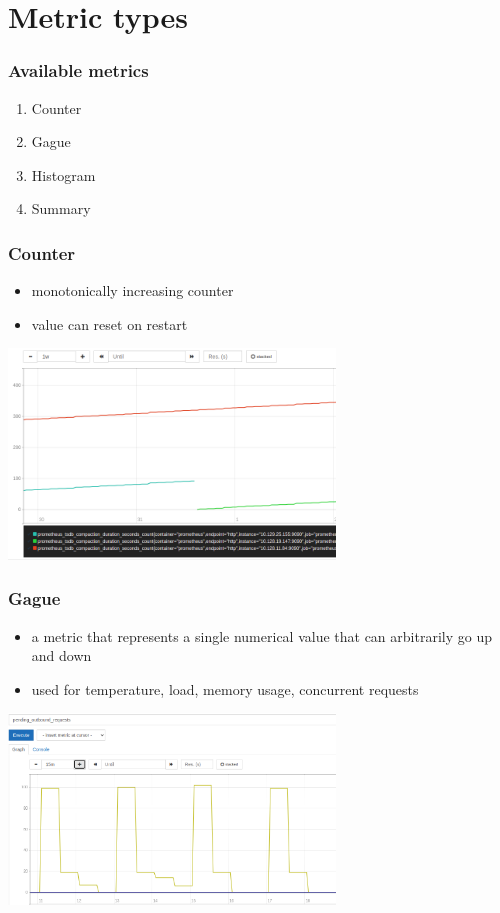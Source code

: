 \documentclass[xcolor=dvipsnames]{beamer}
\begin{document}
\section{Metric types}
\begin{frame}
 \frametitle{Available metrics}
 \begin{enumerate}
  \item Counter
  \item Gague
  \item Histogram
  \item Summary
 \end{enumerate}
\end{frame}
\begin{frame}
 \frametitle{Counter}
 \begin{itemize}
  \item  monotonically increasing counter
  \item value can reset on restart
 \end{itemize}
 \centering
\includegraphics[width=0.65\textwidth]{counter.png}
\end{frame}

\begin{frame}
 \frametitle{Gague}
 \begin{itemize}
  \item  a metric that represents a single numerical value that can arbitrarily go up and down
  \item used for temperature, load, memory usage, concurrent requests
 \end{itemize}
 \centering
\includegraphics[width=0.65\textwidth]{gague.png}
\end{frame}
\end{document}
